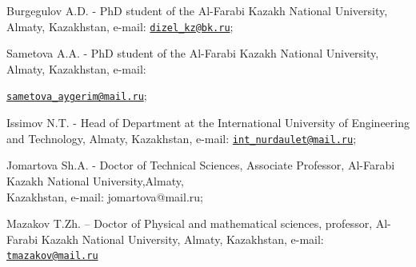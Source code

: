 \begin{authorinfo}
Burgegulov A.D. - PhD student of the Al-Farabi Kazakh National
University, Almaty, Kazakhstan, e-mail:
\href{mailto:dizel_kz@bk.ru}{\nolinkurl{dizel\_kz@bk.ru}};

Sametova A.A. - PhD student of the Al-Farabi Kazakh National University,
Almaty, Kazakhstan, e-mail:

\href{mailto:sametova_aygerim@mail.ru}{\nolinkurl{sametova\_aygerim@mail.ru}};

Issimov N.T. - Head of Department at the International University of
Engineering and Technology, Almaty, Kazakhstan, e-mail:
\href{mailto:int_nurdaulet@mail.ru}{\nolinkurl{int\_nurdaulet@mail.ru}};

Jomartova Sh.A. - Doctor of Technical Sciences, Associate Professor,
Al-Farabi Kazakh National University,Almaty, \\Kazakhstan, e-mail:
jomartova@mail.ru;

Mazakov T.Zh. -- Doctor of Physical and mathematical sciences,
professor, Al-Farabi Kazakh National University, Almaty, Kazakhstan,
e-mail: \href{mailto:tmazakov@mail.ru}{\nolinkurl{tmazakov@mail.ru}}
\end{authorinfo}

